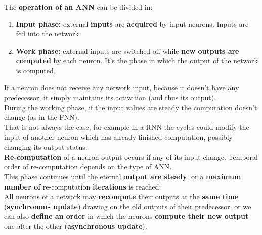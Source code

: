 \documentclass[11pt]{article}
\begin{document}
		The \textbf{operation of an ANN} can be divided in: 
		\begin{enumerate}
			\item \textbf{Input phase:} external \textbf{inputs} are \textbf{acquired} by input neurons. Inputs are fed into the network\\
			
			\item \textbf{Work phase:} external inputs are switched off while \textbf{new outputs are computed} by each neuron. It's the phase in which the output of the network is computed.\\
		\end{enumerate}
		
		If a neuron does not receive any network input, because it doesn't have any predecessor, it simply maintains its activation (and thus its output).\\
		
		During the working phase, if the input values are steady the computation doesn't change (as in the FNN). \\
		That is not always the case, for example in a RNN the cycles could modify the input of another neuron which has already finished computation, possibly changing its output status.\\
		
		\textbf{Re-computation} of a neuron output occurs if any of its input change. Temporal order of re-computation depends on the type of ANN.\\
		This phase continues until the eternal \textbf{output are steady}, or a \textbf{maximum number of} re-computation \textbf{iterations} is reached.\\
		
		All neurons of a network may \textbf{recompute} their outputs at the \textbf{same time} (\textbf{synchronous update}) drawing on the old outputs of their predecessor, or we can also \textbf{define an order} in which the neurons \textbf{compute their new output} one after the other (\textbf{asynchronous update}).\\
		
		\newpage
		
\end{document}
